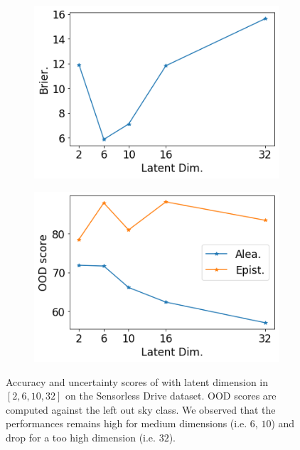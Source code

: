 \begin{figure}[ht]
    \begin{subfigure}[t]{0.33 \textwidth}
        \centering
        \includegraphics[width=1. \textwidth]{sections/006_neurips2020/figures/lat_dim_sen_brier.png}
    \end{subfigure}%
    \begin{subfigure}[t]{0.33 \textwidth}
        \centering
        \includegraphics[width=1. \textwidth]{sections/006_neurips2020/figures/lat_dim_sen_ood.png}
    \end{subfigure}%

    \caption{Accuracy and uncertainty scores of \PostNetacro with latent dimension in $[2, 6, 10, 32]$ on the Sensorless Drive dataset. OOD scores are computed against the left out sky class. We observed that the performances remains high for medium dimensions (i.e. $6$, $10$) and drop for a too high dimension (i.e. $32$).}
    \label{fig:latent_dim_sensorless_drive}
\end{figure}

